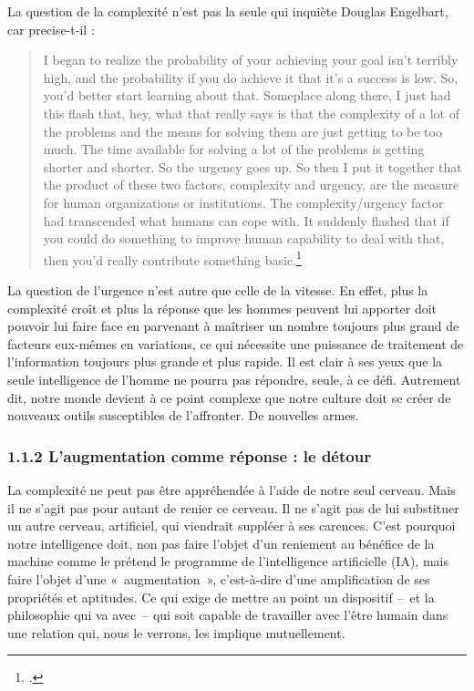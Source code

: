 \documentclass{FramateX}
\begin{document}
\begin{refsection}
La question de la complexité n'est pas la seule qui inquiète Douglas
Engelbart, car precise-t-il : 

\begin{quote}
I began to realize the probability of
your achieving your goal isn't terribly high, and the
probability if you do achieve it that it's a success
is low. So, you'd better start learning about that.
Someplace along there, I just had this flash that, hey, what that
really says is that the complexity of a lot of the problems and the
means for solving them are just getting to be too much. The time
available for solving a lot of the problems is getting shorter and
shorter. So the urgency goes up. So then I put it together that the
product of these two factors, complexity and urgency, are the measure
for human organizations or institutions. The complexity/urgency factor
had transcended what humans can cope with. It suddenly flashed that if
you could do something to improve human capability to deal with that,
then you'd really contribute something basic.\footnote{\cite[p.~10]{bardinibootstrapping2001}.}
\end{quote}

 La question de l'urgence n'est autre que celle de la vitesse. En
effet, plus la complexité croît et plus la réponse que les hommes
peuvent lui apporter doit pouvoir lui faire face en parvenant à
maîtriser un nombre toujours plus grand de facteurs eux-mêmes en
variations, ce qui nécessite une puissance de traitement de
l'information toujours plus grande et plus rapide. Il est clair à ses
yeux que la seule intelligence de l'homme ne pourra pas répondre,
seule, à ce défi. Autrement dit, notre monde devient à ce point
complexe que notre culture doit se créer de nouveaux outils
susceptibles de l'affronter. De nouvelles armes. 


\subsubsection*{1.1.2 L'augmentation comme réponse : le détour}
{}

La complexité ne peut pas être appréhendée à l'aide de notre seul
cerveau. Mais il ne s'agit pas pour autant de renier ce cerveau. Il ne
s'agit pas de lui substituer un autre cerveau, artificiel, qui
viendrait suppléer à ses carences. C'est pourquoi notre intelligence
doit, non pas faire l'objet d'un reniement au bénéfice de la machine
comme le prétend le programme de l'intelligence artificielle (IA), mais
faire l'objet d'une «~augmentation~», c'est-à-dire d'une amplification
de ses propriétés et aptitudes. Ce qui exige de mettre au point un
dispositif --~et la philosophie qui va avec~-- qui soit capable de
travailler avec l'être humain dans une relation qui, nous le verrons, les implique mutuellement.


\end{refsection}
\end{document}
